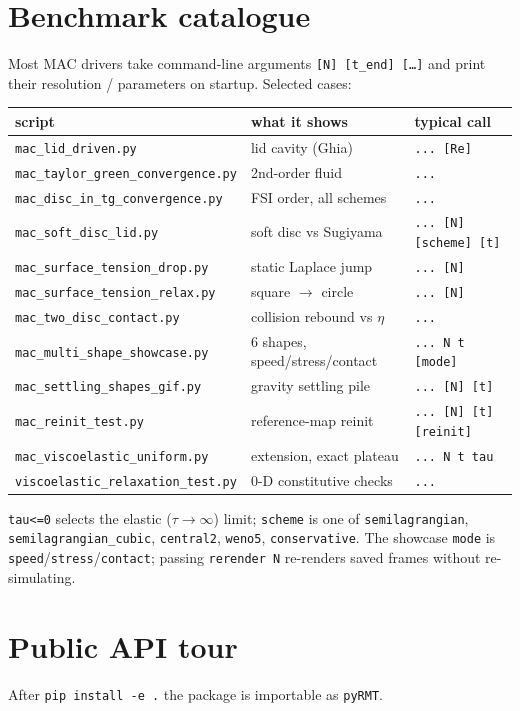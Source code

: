 \documentclass[11pt]{article}
\begin{document}
\section{Benchmark catalogue}
Most MAC drivers take command-line arguments \texttt{[N] [t\_end] [\dots]} and print
their resolution / parameters on startup. Selected cases:
\begin{center}
\small
\begin{tabular}{lll}
\toprule
script & what it shows & typical call \\
\midrule
\texttt{mac\_lid\_driven.py} & lid cavity (Ghia) & \texttt{... [Re]} \\
\texttt{mac\_taylor\_green\_convergence.py} & 2nd-order fluid & \texttt{...} \\
\texttt{mac\_disc\_in\_tg\_convergence.py} & FSI order, all schemes & \texttt{...} \\
\texttt{mac\_soft\_disc\_lid.py} & soft disc vs Sugiyama & \texttt{... [N] [scheme] [t]} \\
\texttt{mac\_surface\_tension\_drop.py} & static Laplace jump & \texttt{... [N]} \\
\texttt{mac\_surface\_tension\_relax.py} & square $\to$ circle & \texttt{... [N]} \\
\texttt{mac\_two\_disc\_contact.py} & collision rebound vs $\eta$ & \texttt{...} \\
\texttt{mac\_multi\_shape\_showcase.py} & 6 shapes, speed/stress/contact & \texttt{... N t [mode]} \\
\texttt{mac\_settling\_shapes\_gif.py} & gravity settling pile & \texttt{... [N] [t]} \\
\texttt{mac\_reinit\_test.py} & reference-map reinit & \texttt{... [N] [t] [reinit]} \\
\texttt{mac\_viscoelastic\_uniform.py} & extension, exact plateau & \texttt{... N t tau} \\
\texttt{viscoelastic\_relaxation\_test.py} & 0-D constitutive checks & \texttt{...} \\
\bottomrule
\end{tabular}
\end{center}
\texttt{tau<=0} selects the elastic ($\tau\!\to\!\infty$) limit; \texttt{scheme} is
one of \texttt{semilagrangian}, \texttt{semilagrangian\_cubic}, \texttt{central2},
\texttt{weno5}, \texttt{conservative}. The showcase \texttt{mode} is
\texttt{speed}/\texttt{stress}/\texttt{contact}; passing \texttt{rerender N} re-renders
saved frames without re-simulating.

\section{Public API tour}
After \texttt{pip install -e .} the package is importable as \texttt{pyRMT}.
\end{document}
